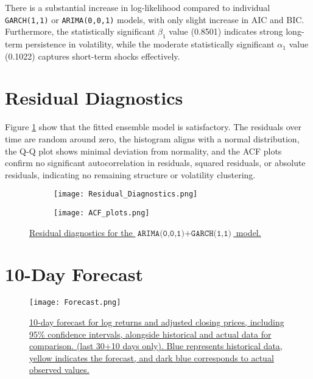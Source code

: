 \documentclass{article}
\newcommand{\1}{\mathbbm{1}}
\theoremstyle{definition}
\begin{document}
There is a substantial increase in log-likelihood compared to individual \texttt{GARCH(1,1)} or \texttt{ARIMA(0,0,1)} models, with only slight increase in AIC and BIC. Furthermore, the statistically significant $\beta_1$ value (0.8501) indicates strong long-term persistence in volatility, while the moderate statistically significant $\alpha_1$ value (0.1022) captures short-term shocks effectively.








\section{Residual Diagnostics}

Figure \ref{fig:residual_diagnostics} show that the fitted ensemble model is satisfactory. The residuals over time are random around zero, the histogram aligns with a normal distribution, the Q-Q plot shows minimal deviation from normality, and the ACF plots confirm no significant autocorrelation in residuals, squared residuals, or absolute residuals, indicating no remaining structure or volatility clustering.



\begin{figure}[H]
\centering
\begin{subfigure}{\textwidth}
    \centering
    \texttt{[image: Residual\_Diagnostics.png]}
\end{subfigure}

\begin{subfigure}{\textwidth}
    \centering
    \texttt{[image: ACF\_plots.png]}
\end{subfigure}

\caption{\small{\href{https://github.com/Stochastic1017/Walmart-Stock-Forecasting/blob/main/R/Plot_Residual_Diagnostics.R}{Residual diagnostics for the $\texttt{ARIMA(0,0,1)} + \texttt{GARCH(1,1)}$ model.}}}
\label{fig:residual_diagnostics}
\end{figure}










\section{10-Day Forecast}

\begin{figure}[H]
\centering
\texttt{[image: Forecast.png]}
\caption{\small{\href{https://github.com/Stochastic1017/Walmart-Stock-Forecasting/blob/main/R/Plot_Forecast.R}{10-day forecast for log returns and adjusted closing prices, including 95\% confidence intervals, alongside historical and actual data for comparison. (last 30+10 days only). Blue represents historical data, yellow indicates the forecast, and dark blue corresponds to actual observed values.}}}
\label{fig:forecast}
\end{figure}
\end{document}
